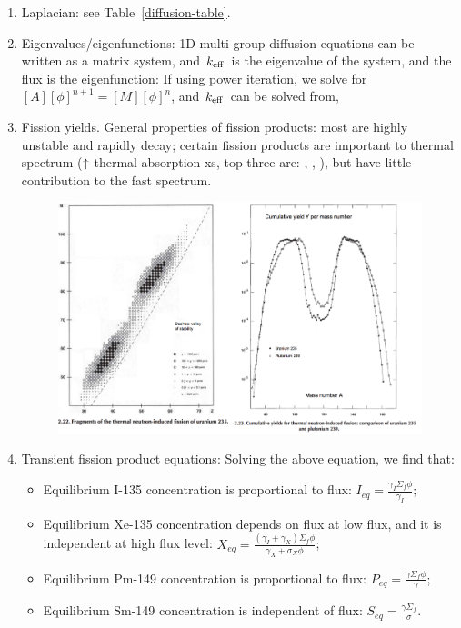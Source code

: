 \documentclass{school-22.211-notes}
\begin{document}
\begin{enumerate}
\item Laplacian: see Table~\ref{diffusion-table}.

\item Eigenvalues/eigenfunctions: 1D multi-group diffusion equations can be written as a matrix system, and $\left. k_{\mathrm{eff}} \right.$ is the eigenvalue of the system, and the flux is the eigenfunction: 
  If using power iteration, we solve for $[A][\phi]^{n+1} = [M] [\phi]^n$, and $\left. k_{\mathrm{eff}} \right.$ can be solved from,


\item Fission yields. General properties of fission products: most are highly unstable and rapidly decay; certain fission products are important to thermal spectrum ($\uparrow$ thermal absorption xs, top three are: , , ), but have little contribution to the fast spectrum. 
\begin{figure}[ht]
  \centering
  \includegraphics[width=5in]{images/dfs/fission-product-yield.png}
\end{figure}

\item Transient fission product equations: 
 Solving the above equation, we find that: 
 \begin{itemize}
   \item Equilibrium I-135 concentration is proportional to flux: $I_{eq} = \frac{\gamma_I \Sigma_f \phi}{\gamma_I}$;
   \item Equilibrium Xe-135 concentration depends on flux at low flux, and it is independent at high flux level: $X_{eq} = \frac{(\gamma_I + \gamma_X) \Sigma_f \phi}{\gamma_X + \sigma_X \phi}$;
   \item Equilibrium Pm-149 concentration is proportional to flux: $P_{eq} = \frac{\gamma \Sigma_f \phi}{\gamma}$;
   \item Equilibrium Sm-149 concentration is independent of flux: $S_{eq} = \frac{\gamma \Sigma_f}{\sigma}$. 
 \end{itemize}


\end{enumerate}
\end{document}
